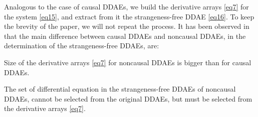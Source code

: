 \documentclass[final,reqno]{siamltex}
\renewenvironment{enumerate}[1]{\begin{compactenum}#1}{\end{compactenum}}
\begin{document}
Analogous to the case of causal DDAEs, we build the derivative arrays \eqref{eq7} for the system \eqref{eq15}, and extract from it the 
strangeness-free DDAE \eqref{eq16}. To keep the brevity of the paper, we will not repeat the process.
It has been observed in \cite{HaM14} that the main difference between causal DDAEs and noncausal DDAEs, in the determination of the 
strangeness-free DDAEs, are:
\begin{enumerate}
 \item[i)] Size of the derivative arrays \eqref{eq7} for noncausal DDAEs is bigger than for causal DDAEs.
 \item[ii)] The set of differential equation in the strangeness-free DDAEs of noncausal DDAEs, cannot be selected from the original DDAEs, but must be 
 selected from the derivative arrays \eqref{eq7}.
\end{enumerate}
\end{document}
